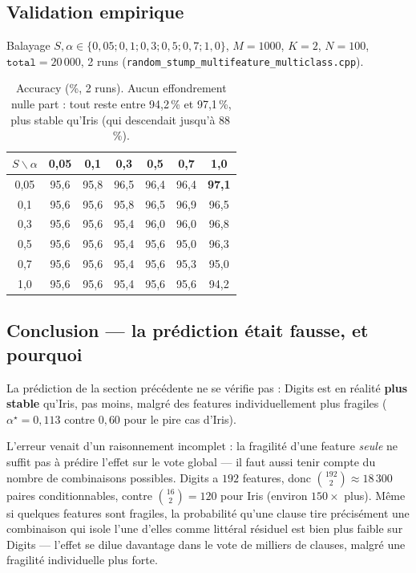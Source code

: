 \documentclass[12pt,a4paper]{article}
\theoremstyle{remark}
\begin{document}
\subsection{Validation empirique}

Balayage $S,\alpha\in\{0{,}05;0{,}1;0{,}3;0{,}5;0{,}7;1{,}0\}$, $M=1000$, $K=2$,
$N=100$, $\mathtt{total}=20\,000$, 2 runs
(\texttt{random\_stump\_multifeature\_multiclass.cpp}).

\begin{table}[h]
\centering
\renewcommand{\arraystretch}{1.2}
\begin{tabular}{ccccccc}
\toprule
$S \backslash \alpha$ & 0,05 & 0,1 & 0,3 & 0,5 & 0,7 & 1,0 \\
\midrule
0,05 & 95,6 & 95,8 & 96,5 & 96,4 & 96,4 & \textbf{97,1} \\
0,1  & 95,6 & 95,6 & 95,8 & 96,5 & 96,9 & 96,5 \\
0,3  & 95,6 & 95,6 & 95,4 & 96,0 & 96,0 & 96,8 \\
0,5  & 95,6 & 95,6 & 95,4 & 95,6 & 95,0 & 96,3 \\
0,7  & 95,6 & 95,6 & 95,4 & 95,6 & 95,3 & 95,0 \\
1,0  & 95,6 & 95,6 & 95,4 & 95,6 & 95,6 & 94,2 \\
\bottomrule
\end{tabular}
\caption{Accuracy (\%, 2 runs). Aucun effondrement nulle part : tout reste entre
94,2\,\% et 97,1\,\%, plus stable qu'Iris (qui descendait jusqu'à 88\,\%).}
\end{table}

\subsection{Conclusion --- la prédiction était fausse, et pourquoi}

La prédiction de la section précédente ne se vérifie pas : Digits est en
réalité \textbf{plus stable} qu'Iris, pas moins, malgré des features
individuellement plus fragiles ($\alpha^\star=0{,}113$ contre $0{,}60$ pour le
pire cas d'Iris).

L'erreur venait d'un raisonnement incomplet : la fragilité d'une feature
\emph{seule} ne suffit pas à prédire l'effet sur le vote global --- il faut
aussi tenir compte du nombre de combinaisons possibles. Digits a $192$
features, donc $\binom{192}{2}\approx18\,300$ paires conditionnables, contre
$\binom{16}{2}=120$ pour Iris (environ $150\times$ plus). Même si quelques
features sont fragiles, la probabilité qu'une clause tire précisément une
combinaison qui isole l'une d'elles comme littéral résiduel est bien plus
faible sur Digits --- l'effet se dilue davantage dans le vote de milliers de
clauses, malgré une fragilité individuelle plus forte.
\end{document}
